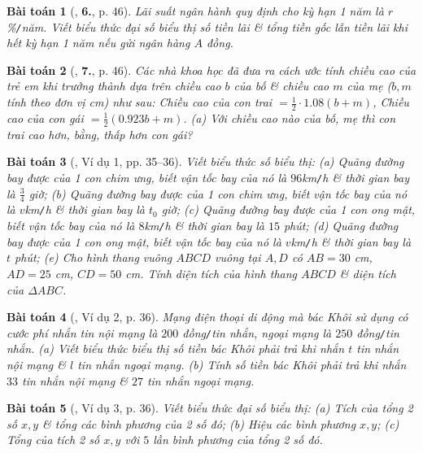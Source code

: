\documentclass{article}
\numberwithin{equation}{section}
\newtheorem{baitoan}{Bài toán}
\begin{document}
\begin{baitoan}[\cite{SGK_Toan_7_Canh_Dieu_tap_2}, \textbf{6.}, p. 46]
	Lãi suất ngân hành quy định cho kỳ hạn 1 năm là $r$\%\emph{\texttt{/}}năm. Viết biểu thức đại số biểu thị số tiền lãi \& tổng tiền gốc lẫn tiền lãi khi hết kỳ hạn 1 năm nếu gửi ngân hàng $A$ đồng.
\end{baitoan}

\begin{baitoan}[\cite{SGK_Toan_7_Canh_Dieu_tap_2}, \textbf{7.}, p. 46]
	Các nhà khoa học đã đưa ra cách ước tính chiều cao của trẻ em khi trưởng thành dựa trên chiều cao $b$ của bố \& chiều cao $m$ của mẹ ($b,m$ tính theo đơn vị cm) như sau: Chiều cao của con trai $= \frac{1}{2}\cdot1.08(b + m)$, Chiều cao của con gái $= \frac{1}{2}(0.923b + m)$. (a) Với chiều cao nào của bố, mẹ thì con trai cao hơn, bằng, thấp hơn con gái?
\end{baitoan}

\begin{baitoan}[\cite{SBT_Toan_7_Canh_Dieu_tap_2}, Ví dụ 1, pp. 35--36]
	Viết biểu thức số biểu thị: (a) Quãng đường bay được của 1 con chim ưng, biết vận tốc bay của nó là $96$\emph{km\texttt{/}h} \& thời gian bay là $\frac{3}{4}$ giờ; (b) Quãng đường bay được của 1 con chim ưng, biết vận tốc bay của nó là $v$\emph{km\texttt{/}h} \& thời gian bay là $t_0$ giờ; (c) Quãng đường bay được của 1 con ong mật, biết vận tốc bay của nó là $8$\emph{km\texttt{/}h} \& thời gian bay là $15$ phút; (d) Quãng đường bay được của 1 con ong mật, biết vận tốc bay của nó là $v$\emph{km\texttt{/}h} \& thời gian bay là $t$ phút; (e) Cho hình thang vuông $ABCD$ vuông tại $A,D$ có $AB = 30$ \emph{cm}, $AD = 25$ \emph{cm}, $CD = 50$ \emph{cm}. Tính diện tích của hình thang $ABCD$ \& diện tích của $\Delta ABC$.
\end{baitoan}

\begin{baitoan}[\cite{SBT_Toan_7_Canh_Dieu_tap_2}, Ví dụ 2, p. 36]
	Mạng điện thoại di động mà bác Khôi sử dụng có cước phí nhắn tin nội mạng là $200$ đồng\emph{\texttt{/}}tin nhắn, ngoại mạng là $250$ đồng\emph{\texttt{/}}tin nhắn. (a) Viết biểu thức biểu thị số tiền bác Khôi phải trả khi nhắn $t$ tin nhắn nội mạng \& $l$ tin nhắn ngoại mạng. (b) Tính số tiền bác Khôi phải trả khi nhắn $33$ tin nhắn nội mạng \& $27$ tin nhắn ngoại mạng.
\end{baitoan}

\begin{baitoan}[\cite{SBT_Toan_7_Canh_Dieu_tap_2}, Ví dụ 3, p. 36]
	Viết biểu thức đại số biểu thị: (a) Tích của tổng 2 số $x,y$ \& tổng các bình phương của 2 số đó; (b) Hiệu các bình phương $x,y$; (c) Tổng của tích 2 số $x,y$ với $5$ lần bình phương của tổng 2 số đó.
\end{baitoan}
\end{document}
